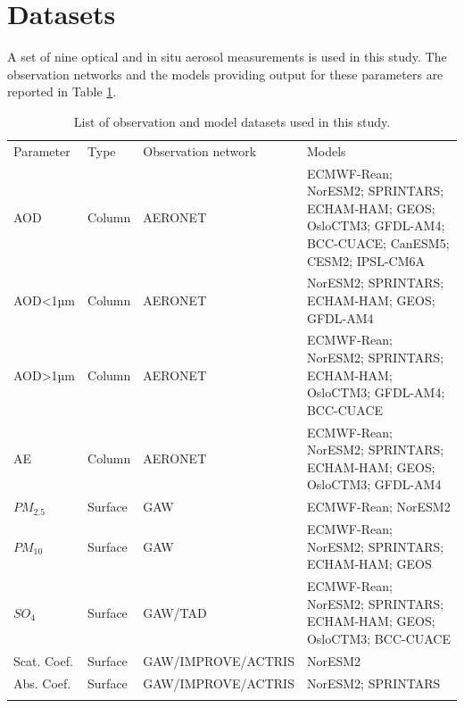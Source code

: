 \documentclass[journal abbreviation, manuscript]{copernicus}
\begin{document}
\section{Datasets}
A set of nine optical and in situ aerosol measurements is used in this study. The observation networks and the models providing output for these parameters are reported in Table \ref{table:datasets}.

\begin{table}
 \begin{tabularx}{\textwidth}{lllX}
  \tophline
  Parameter   & Type    & Observation network & Models                                                                                                    \\
  \middlehline
  AOD         & Column  & AERONET             & ECMWF-Rean; NorESM2; SPRINTARS; ECHAM-HAM; GEOS; OsloCTM3; GFDL-AM4; BCC-CUACE; CanESM5; CESM2; IPSL-CM6A \\
  AOD<1µm     & Column  & AERONET             & NorESM2; SPRINTARS; ECHAM-HAM; GEOS; GFDL-AM4                                                             \\
  AOD>1µm     & Column  & AERONET             & ECMWF-Rean; NorESM2; SPRINTARS; ECHAM-HAM; OsloCTM3; GFDL-AM4; BCC-CUACE                                  \\
  AE          & Column  & AERONET             & ECMWF-Rean; NorESM2; SPRINTARS; ECHAM-HAM; GEOS; OsloCTM3; GFDL-AM4                                       \\
  $PM_{2.5}$  & Surface & GAW                 & ECMWF-Rean; NorESM2                                                                                       \\
  $PM_{10}$   & Surface & GAW                 & ECMWF-Rean; NorESM2; SPRINTARS; ECHAM-HAM; GEOS                                                           \\
  $SO_{4}$    & Surface & GAW/TAD             & ECMWF-Rean; NorESM2; SPRINTARS; ECHAM-HAM; GEOS; OsloCTM3; BCC-CUACE                                      \\
  Scat. Coef. & Surface & GAW/IMPROVE/ACTRIS  & NorESM2                                                                                                   \\
  Abs. Coef.  & Surface & GAW/IMPROVE/ACTRIS  & NorESM2; SPRINTARS                                                                                        \\
  \bottomhline
 \end{tabularx}
 \caption{List of observation and model datasets used in this study.}
 \label{table:datasets}
\end{table}
\end{document}
